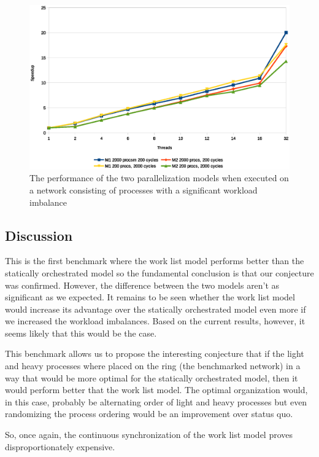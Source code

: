 \begin{figure}
\centering
\includegraphics[width=\textwidth]{graphs/uneven}
\caption[Benchmark of uneven workloads]{The performance of the two
  parallelization models when executed on a network consisting of
  processes with a significant workload imbalance}
\label{fig:uneven}
\end{figure}

\subsection{Discussion}
This is the first benchmark where the work list model performs better
than the statically orchestrated model so the fundamental conclusion
is that our conjecture was confirmed. However, the difference between
the two models aren't as significant as we expected. It remains to be
seen whether the work list model would increase its advantage over the
statically orchestrated model even more if we increased the workload
imbalances. Based on the current results, however, it seems likely
that this would be the case.

This benchmark allows us to propose the interesting conjecture that if
the light and heavy processes where placed on the ring (the benchmarked
network) in a way that would be more optimal for the statically
orchestrated model, then it would perform better that the
work list model. The optimal organization would, in this case,
probably be alternating order of light and heavy processes but even
randomizing the process ordering would be an improvement
over status quo.

So, once again, the continuous synchronization of the work list model
proves disproportionately expensive.

